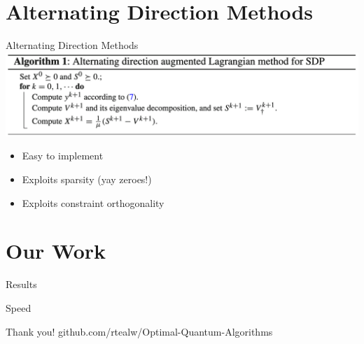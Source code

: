 \documentclass[12pt]{beamer}
\begin{document}
\section{Alternating Direction Methods}
\begin{frame}{Alternating Direction Methods \cite{adm}}
\centering
\includegraphics[scale=.15]{figures/adm_algorithm}
\bigskip
\begin{itemize}
    \item Easy to implement
    \item Exploits sparsity (yay zeroes!)
    \item Exploits constraint orthogonality
\end{itemize}
\end{frame}

\section{Our Work}
\begin{frame}{Results}
    
\end{frame}

\begin{frame}{Speed}
    
\end{frame}

\begin{frame}{Thank you!}
\centering
github.com/rtealw/Optimal-Quantum-Algorithms
\medskip


\end{frame}
\end{document}
